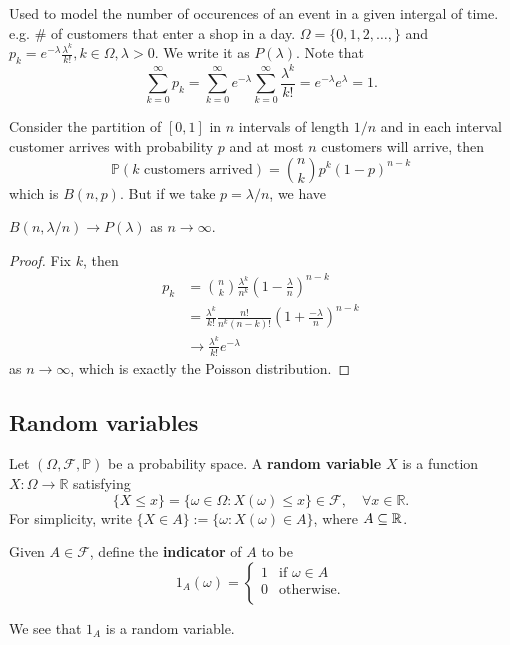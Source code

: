 \begin{example}
    Used to model the number of occurences of an event in a given intergal of time. e.g. \# of customers that enter a shop in a day. $ \Omega=\{0,1,2,\dots,\} $ and $ p_k = e^{-\lambda}\frac{\lambda^k}{k!}, k\in \Omega, \lambda>0 $. We write it as $ P(\lambda) $. Note that 
    \[
        \sum_{k=0}^{\infty}p_k=\sum_{k=0}^{\infty} e^{-\lambda}\sum_{k=0}^{\infty}\frac{\lambda^k}{k!}=e^{-\lambda}e^\lambda=1.
    \]
\end{example}

Consider the partition of $[0,1]$ in $n$ intervals of length $1/n$ and in each interval customer arrives with probability $p$ and at most $n$ customers will arrive, then
$$\mathbb P(\text{$k$ customers arrived})=\binom{n}{k}p^k(1-p)^{n-k}$$
which is $B(n,p)$.
But if we take $p=\lambda/n$, we have
\begin{proposition}
    $B(n,\lambda/n)\to P(\lambda)$ as $n\to\infty$.
\end{proposition}
\begin{proof}
    Fix $k$, then
    \begin{align*}
        p_k&=\binom{n}{k}\frac{\lambda^k}{n^k}\left(1-\frac{\lambda}{n}\right)^{n-k}\\
        &=\frac{\lambda^k}{k!}\frac{n!}{n^k(n-k)!}(1+\frac{-\lambda}{n})^{n-k}\\
        &\to\frac{\lambda^k}{k!}e^{-\lambda}
    \end{align*}
    as $n\to\infty$, which is exactly the Poisson distribution.
\end{proof}

\subsection{Random variables}
\begin{definition}
    Let $ (\Omega,\mathscr{F},\mathbb{P}) $ be a probability space. A \textbf{random variable} $X$ is a function $ X: \Omega\to \mathbb{R} $ satisfying 
    \[
        \{X\le x\}=\{\omega\in \Omega: X(\omega)\le x\}\in \mathscr{F},\quad \forall x\in \mathbb{R}.
    \]
    For simplicity, write $ \{X\in A\}:= \{\omega:X(\omega)\in A\} $, where $A \subseteq {\mathbb{R}}$.
\end{definition}

\begin{definition}
    Given $ A\in \mathscr{F} $, define the \textbf{indicator} of $A$ to be 
    \[
        1_A (\omega) = \begin{cases}
        1 &\text{if } \omega\in A\\
        0 &\text{otherwise.}\\
        \end{cases} 
    \]
\end{definition}
We see that $1_A$ is a random variable.

